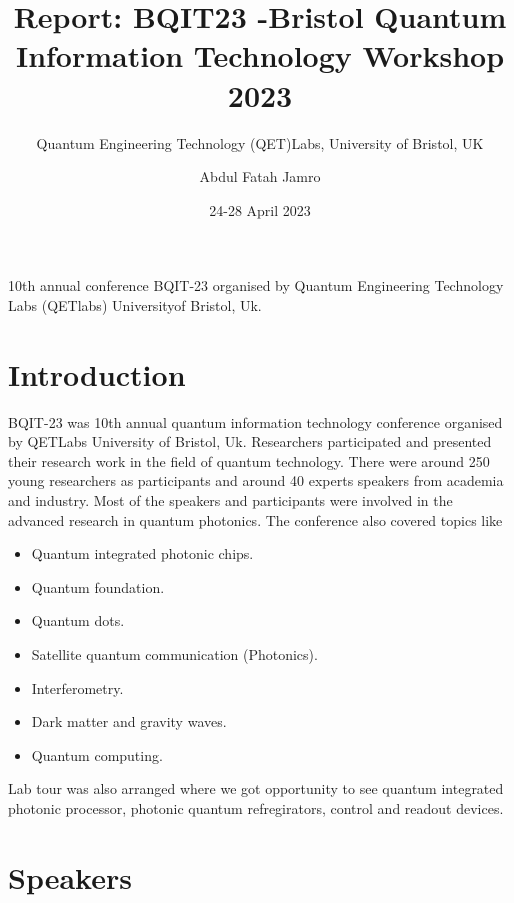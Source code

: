 \documentclass[a4paper, 12pt]{scrartcl}
\title{Report: BQIT23 -Bristol Quantum Information Technology Workshop 2023}
\subtitle{Quantum Engineering Technology (QET)Labs, University of Bristol, UK}
\author{Abdul Fatah Jamro}
\date{24-28 April 2023 }
\begin{document}
\maketitle
  10th annual conference BQIT-23 organised by Quantum Engineering Technology
  Labs (QETlabs) Universityof Bristol, Uk.

\section{Introduction}
  BQIT-23 was 10th annual quantum information technology conference organised 
  by QETLabs University of Bristol, Uk. Researchers participated and presented 
  their research work in the field of quantum technology. There were around 250
  young researchers as participants and around 40 experts speakers from academia and industry.
  Most of the speakers and participants were involved in the advanced research in quantum photonics. 
  The conference also covered topics like 

\begin{itemize}
  \item Quantum integrated photonic chips.
  \item Quantum foundation.
  \item Quantum dots.
  \item Satellite quantum communication (Photonics).
  \item Interferometry.
  \item Dark matter and gravity waves.
  \item Quantum computing.
\end{itemize}

Lab tour was also arranged where we got opportunity to see quantum integrated photonic processor,
photonic quantum refregirators, control and readout devices.

\section{Speakers}
  
\end{document}
